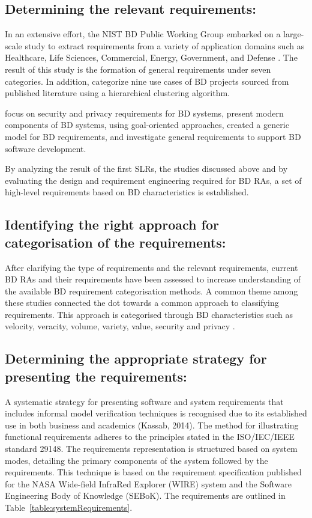 \documentclass[journal]{IEEEtran}
\begin{document}
\subsection{Determining the relevant requirements:}

In an extensive effort, the NIST BD Public Working Group embarked on a large-scale study to extract requirements from a variety of application domains such as Healthcare, Life Sciences, Commercial, Energy, Government, and Defense \cite{Chang}. The result of this study is the formation of general requirements under seven categories. In addition, \cite{volk2020identifying} categorize nine use cases of BD projects sourced from published literature using a hierarchical clustering algorithm. 

\cite{AtaeiSecurity}\cite{AtaeiSecurity} focus on security and privacy requirements for BD systems, \cite{yu2019components} present modern components of BD systems, using goal-oriented approaches, \cite{eridaputra2014modeling} created a generic model for BD requirements, and  \cite{al2016characteristics} investigate general requirements to support BD software development. 

By analyzing the result of the first SLRs, the studies discussed above and by evaluating the design and requirement engineering required for BD RAs, a set of high-level requirements based on BD characteristics is established. 

\subsection{Identifying the right approach for categorisation of the requirements:}

After clarifying the type of requirements and the relevant requirements, current BD RAs and their requirements have been assessed to increase understanding of the available BD requirement categorisation methods. A common theme among these studies connected the dot towards a common approach to classifying requirements. This approach is categorised through BD characteristics such as velocity, veracity, volume, variety, value, security and privacy \cite{ataei2022state, Bahrami2015,rad2017big,Chen2016a}.

\subsection{Determining the appropriate strategy for presenting the requirements:} A systematic strategy for presenting software and system requirements that includes informal model verification techniques is recognised due to its established use in both business and academics (Kassab, 2014). The method for illustrating functional requirements adheres to the principles stated in the ISO/IEC/IEEE standard 29148. The requirements representation is structured based on system modes, detailing the primary components of the system followed by the requirements. This technique is based on the requirement specification published for the NASA Wide-field InfraRed Explorer (WIRE) system and the Software Engineering Body of Knowledge (SEBoK). The requirements are outlined in Table~\ref{table:systemRequirements}.
\end{document}
